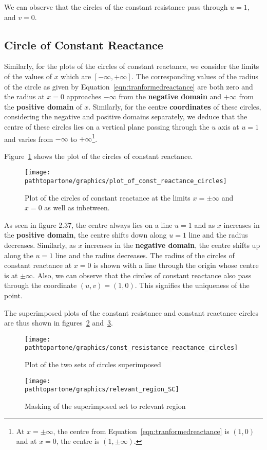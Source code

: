 We can observe that the circles of the constant resistance pass through $u = 1$, and $v = 0$.

\subsection{Circle of Constant Reactance}
Similarly, for the plots of the circles of constant reactance, we consider the limits of the values of $x$ which are $[-\infty, +\infty]$. The corresponding values of the radius of the circle as given by Equation~\eqref{eqn:tranformedreactance} are both zero and the radius at $x = 0$ approaches $-\infty$ from the \textbf{negative domain} and $+\infty$ from the \textbf{positive domain} of $x$. Similarly, for the centre \textbf{coordinates} of these circles, considering the negative and positive domains separately, we deduce that the centre of these circles lies on a vertical plane passing through the $u$ axis at $u = 1$ and varies from $-\infty$ to $+\infty$\footnote{
At $x = \pm\infty$, the centre from Equation~\eqref{eqn:tranformedreactance} is $(1, 0)$ and at $x = 0$, the centre is $(1, \pm\infty)$.
}.

Figure~\ref{fig:uytrdbn} shows the plot of the circles of constant reactance.
\begin{figure}[h]
\centering
\texttt{[image: \\pathtopartone/graphics/plot\_of\_const\_reactance\_circles]}
\caption{Plot of the circles of constant reactance at the limits $x = \pm\infty$ and $x = 0$ as well as inbetween.}
\label{fig:uytrdbn}
\end{figure}

As seen in figure 2.37, the centre always lies on a line $u = 1$ and as $x$ increases in the \textbf{positive domain}, the centre shifts down along $u = 1$ line and the radius decreases. Similarly, as $x$ increases in the \textbf{negative domain}, the centre shifts up along the $u = 1$ line and the radius decreases. The radius of the circles of constant reactance at $x = 0$ is shown with a line through the origin whose centre is at $\pm\infty$. Also, we can observe that the circles of constant reactance also pass through the coordinate $(u,v) = (1,0)$. This signifies the uniqueness of the point. 

The superimposed plots of the constant resistance and constant reactance circles are thus shown in figures~\ref{fig:ijnbvcxw} and~\ref{fig:sddfghj}.
\begin{figure}[h]
\centering
\texttt{[image: \\pathtopartone/graphics/const\_resistance\_reactance\_circles]}
\caption{Plot of the two sets of circles superimposed}
\label{fig:ijnbvcxw}
\end{figure}
\begin{figure}[h]
\centering
\texttt{[image: \\pathtopartone/graphics/relevant\_region\_SC]}
\caption{Masking of the superimposed set to relevant region}
\label{fig:sddfghj}
\end{figure}

